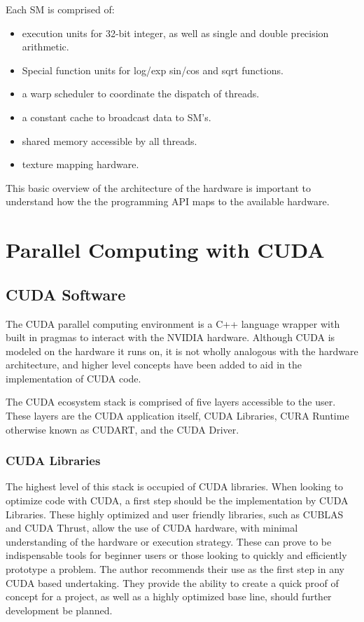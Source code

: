 Each SM is comprised of: \cite{Wilt}
\begin{itemize}
  \item execution units for 32-bit integer, as well as single and double precision arithmetic.
  \item Special function units for log/exp sin/cos and sqrt functions.
  \item a warp scheduler to coordinate the dispatch of threads.
  \item a constant cache to broadcast data to SM's.
  \item shared memory accessible by all threads.
  \item texture mapping hardware.
\end{itemize}

This basic overview of the architecture of the hardware is important to understand
how the the programming API maps to the available hardware.


\section{Parallel Computing with CUDA}
\subsection{CUDA Software}

The CUDA parallel computing environment is a C++ language wrapper with built in
pragmas to interact with the NVIDIA hardware.  Although CUDA is modeled on the
hardware it runs on, it is not wholly analogous with the hardware architecture,
and higher level concepts have been added to aid in the implementation of CUDA code.
\par
The CUDA ecosystem stack is comprised of five layers accessible to the user.
These layers are the CUDA application itself, CUDA Libraries, CURA Runtime otherwise
known as CUDART, and the CUDA Driver.


\subsubsection{CUDA Libraries}

The highest level of this stack is occupied
of CUDA libraries. When looking to optimize code with CUDA, a
first step should be the implementation by CUDA Libraries.  These highly optimized
and user friendly libraries, such as CUBLAS and CUDA Thrust, allow the use of
CUDA hardware, with minimal understanding of the hardware or execution strategy.  These can prove
to be indispensable tools for beginner users or those looking to quickly and
efficiently prototype a problem. The author recommends their use as the first step
in any CUDA based undertaking. They provide the ability to create a quick proof
of concept for a project, as well as a highly optimized base line, should further
development be planned.

